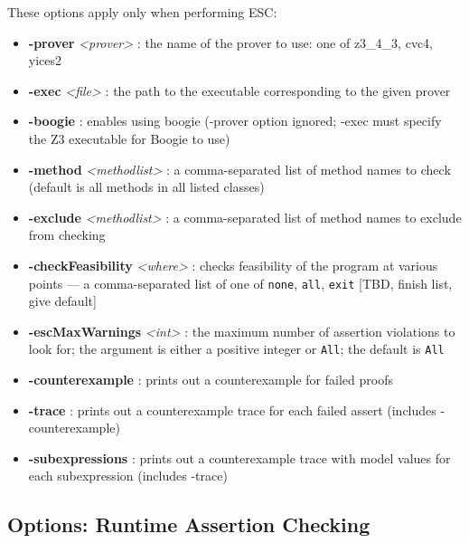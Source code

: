 These options apply only when performing ESC:
\begin{itemize}
\item \textbf{-prover} \textit{<prover>} : the name of the prover to use: one of z3\_4\_3, cvc4, yices2
\item \textbf{-exec} \textit{<file>} : the path to the executable corresponding to the given prover
\item \textbf{-boogie} : enables using boogie (-prover option ignored; -exec must specify the Z3 executable for Boogie to use)
\item \textbf{-method} \textit{<methodlist>} : a comma-separated list of method names to
check (default is all methods in all listed classes)
\item \textbf{-exclude} \textit{<methodlist>} : a comma-separated list of method names to exclude from checking
\item \textbf{-checkFeasibility} \textit{<where>} : checks feasibility of the program at various points --- a comma-separated list of
one of \texttt{none}, \texttt{all}, \texttt{exit} [TBD, finish list,  give default]
\item \textbf{-escMaxWarnings} \textit{<int>} : the maximum number of assertion violations to look for; the argument is either a positive integer or \texttt{All}; the default is \texttt{All}
\item \textbf{-counterexample} : prints out a counterexample for failed proofs
\item \textbf{-trace} : prints out a counterexample trace for each failed assert (includes -counterexample)
\item \textbf{-subexpressions} : prints out a counterexample trace with model values for each subexpression (includes -trace)
\end{itemize}

\subsection{Options: Runtime Assertion Checking}
\label{OptionsRAC}

